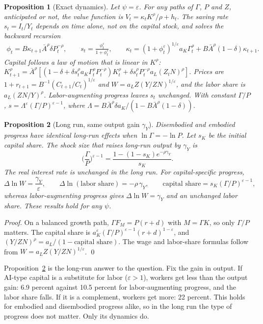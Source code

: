 \documentclass[11pt]{article}
\newtheorem{proposition}{Proposition}
\newcommand{\e}{\varepsilon}
\begin{document}
\begin{proposition}[Exact dynamics]\label{prop:exact}
Let $\psi=\e$. For any paths of $\Gamma$, $P$ and $Z$, anticipated or not, the value function
is $V_t=\kappa_tK^\rho/\rho+h_t$. The saving rate $s_t=I_t/Y_t$ depends on time alone, not
on the capital stock, and solves the backward recursion
\begin{gather*}
\phi_t=B\kappa_{t+1}\bar A^\rho\delta P_t^{-\rho},\qquad
s_t=\frac{\phi_t^\e}{1+\phi_t^\e},\qquad
\kappa_t=(1+\phi_t^\e)^{1/\e}a_K\Gamma_t^\rho+B\bar A^\rho(1-\delta)\kappa_{t+1}.
\end{gather*}
Capital follows a law of motion that is linear in $K^\rho$:
$K_{t+1}^\rho=\bar A^\rho[(1-\delta+\delta s_t^\rho a_K\Gamma_t^\rho P_t^{-\rho})K_t^\rho+\delta s_t^\rho P_t^{-\rho}a_L(Z_tN)^\rho]$.
Prices are $1+r_{t+1}=B^{-1}(C_{t+1}/C_t)^{1/\e}$ and $W=a_LZ(Y/ZN)^{1/\e}$, and the labor
share is $a_L(ZN/Y)^\rho$. Labor-augmenting progress leaves $s_t$ unchanged. With
constant $\Gamma/P$, $s=\Lambda^\e(\Gamma/P)^{\e-1}$, where
$\Lambda=B\bar A^\rho\delta a_K/(1-B\bar A^\rho(1-\delta))$.
\end{proposition}

\begin{proposition}[Long run, same output gain $\gamma_Y$]\label{prop:lr}
Disembodied and embodied progress have identical long-run effects when
$\ln\Gamma=-\ln P$. Let $s_K$ be the initial capital share. The shock size that raises
long-run output by $\gamma_Y$ is
\begin{equation*}
\Big(\frac{\Gamma}{P}\Big)^{\e-1}=\frac{1-(1-s_K)e^{-\rho\gamma_Y}}{s_K}.
\end{equation*}
The real interest rate is unchanged in the long run. For capital-specific progress,
\begin{equation*}
\Delta\ln W=\frac{\gamma_Y}{\e},\qquad \Delta\ln(\text{labor share})=-\rho\,\gamma_Y,
\qquad \text{capital share}=s_K(\Gamma/P)^{\e-1},
\end{equation*}
whereas labor-augmenting progress gives $\Delta\ln W=\gamma_Y$ and an unchanged labor share. These
results hold for any $\psi$.
\end{proposition}

\emph{Proof.} On a balanced growth path, $\Gamma F_M=P(r+d)$ with $M=\Gamma K$, so only $\Gamma/P$
matters. The capital share is $a_K^\e(\Gamma/P)^{\e-1}(r+d)^{1-\e}$, and
$(Y/ZN)^\rho=a_L/(1-\text{capital share})$. The wage and labor-share formulas follow
from $W=a_LZ(Y/ZN)^{1/\e}$. \qed

Proposition~\ref{prop:lr} is the long-run answer to the question. Fix the gain in output.
If AI-type capital is a substitute for labor ($\e>1$), workers get less than the output
gain: 6.9 percent against 10.5 percent for labor-augmenting progress, and the labor
share falls. If it is a complement, workers get more: 22 percent. This holds for
embodied and disembodied progress alike, so in the long run the type of progress
does not matter. Only its dynamics do.
\end{document}
